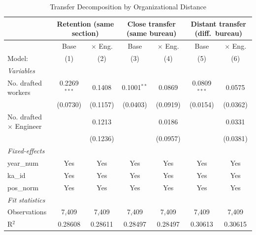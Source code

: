 \begin{table}[htbp]
\centering
\caption{Transfer Decomposition by Organizational Distance}
\label{tab:transfer-decomposition}
\scriptsize
\begin{threeparttable}
\begin{tabular}{lcccccc}
   \tabularnewline \midrule \midrule
 & \multicolumn{2}{c}{Retention (same section)} & \multicolumn{2}{c}{Close transfer (same bureau)} & \multicolumn{2}{c}{Distant transfer (diff.\ bureau)} \\
\midrule
                                  & Base           & $\times$ Eng.  & Base          & $\times$ Eng.  & Base           & $\times$ Eng. \\    
   Model:                         & (1)            & (2)            & (3)           & (4)            & (5)            & (6)\\  
   \midrule
   \emph{Variables}\\
   No. drafted workers            & 0.2269$^{***}$ & 0.1408         & 0.1001$^{**}$ & 0.0869         & 0.0809$^{***}$ & 0.0575\\   
                                  & (0.0730)       & (0.1157)       & (0.0403)      & (0.0919)       & (0.0154)       & (0.0362)\\   
   No. drafted $\times$ Engineer  &                & 0.1213         &               & 0.0186         &                & 0.0331\\   
                                  &                & (0.1236)       &               & (0.0957)       &                & (0.0381)\\   
   \midrule
   \emph{Fixed-effects}\\
   year\_num                      & Yes            & Yes            & Yes           & Yes            & Yes            & Yes\\  
   ka\_id                         & Yes            & Yes            & Yes           & Yes            & Yes            & Yes\\  
   pos\_norm                      & Yes            & Yes            & Yes           & Yes            & Yes            & Yes\\  
   \midrule
   \emph{Fit statistics}\\
   Observations                   & 7,409          & 7,409          & 7,409         & 7,409          & 7,409          & 7,409\\  
   R$^2$                          & 0.28608        & 0.28611        & 0.28497       & 0.28497        & 0.30613        & 0.30615\\  

\end{tabular}
\end{threeparttable}
\end{table}
